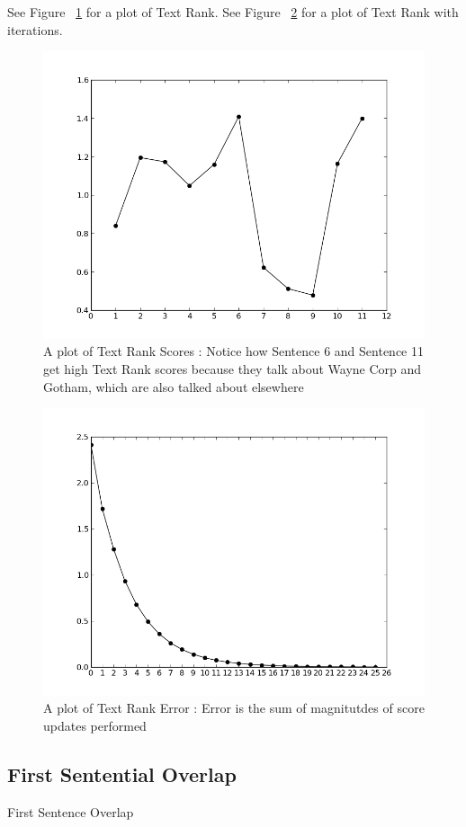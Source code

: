 \documentclass[paper=a4, fontsize=11pt]{scrartcl} %
\numberwithin{equation}{section} %
\numberwithin{figure}{section} %
\numberwithin{table}{section} %
\begin{document}
See Figure ~\ref{fig:tr} for a plot of Text Rank. See Figure ~\ref{fig:error} for a plot of Text Rank with iterations. 

\begin{figure}[h!]
  \centering
    \includegraphics[width=.8\textwidth]{images/tr}
    \caption{A plot of Text Rank Scores : Notice how Sentence 6 and Sentence 11 get high Text Rank scores because they talk about Wayne Corp and Gotham, which are also talked about elsewhere}
    \label{fig:tr}
\end{figure}


\begin{figure}[h!]
  \centering
    \includegraphics[width=.8\textwidth]{images/error}
    \caption{A plot of Text Rank Error : Error is the sum of magnitutdes of score updates performed}
    \label{fig:error}
\end{figure}

\subsection{First Sentential Overlap}
First Sentence Overlap \cite{mead}

\pagebreak
{}

\end{document}
